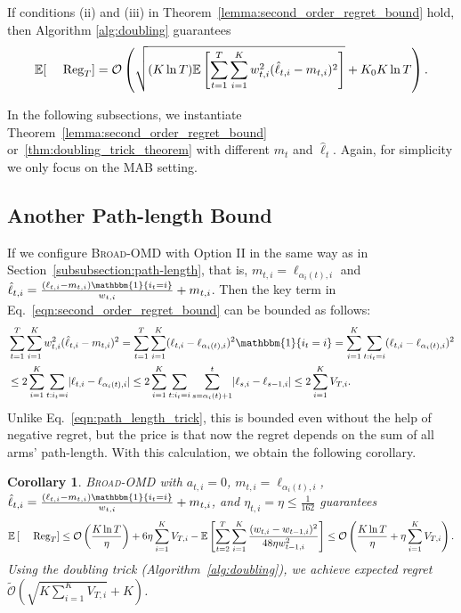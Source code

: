 \documentclass[final, 12pt]{colt2018} %
\newcommand{\abs}[1]{ \lvert {#1} \rvert }
\newcommand{\reg}{\text{\rm Reg}}
\newtheorem{cor}[theorem]{Corollary}
\begin{document}
\begin{theorem}
\label{thm:doubling_trick_theorem}
If conditions (ii) and (iii) in Theorem~\ref{lemma:second_order_regret_bound} hold, then Algorithm \ref{alg:doubling} guarantees
\begin{align*}
\mathbb{E}[\reg_T]=\mathcal{O}\left(\sqrt{(K\ln T)\mathbb{E}\left[\sum_{t=1}^T\sum_{i=1}^Kw_{t,i}^2(\hat{\ell}_{t,i}-m_{t,i})^2\right]}+K_0K\ln T\right).
\end{align*}
\end{theorem}
In the following subsections, we instantiate Theorem~\ref{lemma:second_order_regret_bound} or~\ref{thm:doubling_trick_theorem} with different $m_{t}$ and $\hat{\ell}_t$. Again, for simplicity we only focus on the MAB setting. 

\subsection{Another Path-length Bound}
\label{subsection:first_order_better_k}
If we configure \textsc{Broad-OMD} with Option II in the same way as in Section~\ref{subsubsection:path-length},
that is, $m_{t,i}=\ell_{\alpha_i(t),i}$ and $\hat{\ell}_{t,i}=\frac{(\ell_{t,i}-m_{t,i})\mathbbm{1}\{i_t=i\}}{w_{t,i}}+m_{t,i}$.
Then the key term in Eq.~\eqref{eqn:second_order_regret_bound} can be bounded as follows:
\begin{align}
&\sum_{t=1}^T \sum_{i=1}^K  w_{t,i}^2(\hat{\ell}_{t,i}-m_{t,i})^2= \sum_{t=1}^T\sum_{i=1}^K (\ell_{t,i}-\ell_{\alpha_i(t),i})^2\mathbbm{1}\{i_t=i\} 
= \sum_{i=1}^K \sum_{t:i_t=i} (\ell_{t,i}-\ell_{\alpha_i(t),i})^2 \nonumber \\
&\leq 2 \sum_{i=1}^K \sum_{t:i_t=i} \abs{\ell_{t,i}-\ell_{\alpha_i(t),i}} 
\leq 2 \sum_{i=1}^K \sum_{t:i_t=i} \sum_{s=\alpha_i(t)+1}^t\abs{\ell_{s,i}-\ell_{s-1,i}} \leq 2 \sum_{i=1}^K V_{T,i}. \label{eqn:path_length_calculation_1}
\end{align}
Unlike Eq.~\eqref{eqn:path_length_trick}, this is bounded even without the help of negative regret, but the price is that now the regret depends on the sum of all arms' path-length. With this calculation, we obtain the following corollary.
\begin{cor}
\label{cor:path_length_bound_1}
\textsc{Broad-OMD} with $a_{t,i}=0$, $m_{t,i}=\ell_{\alpha_i(t),i}$, $\hat{\ell}_{t,i}=\frac{(\ell_{t,i}-m_{t,i})\mathbbm{1}\{i_t=i\}}{w_{t,i}}+m_{t,i}$, and $\eta_{t,i}=\eta\leq \frac{1}{162}$ guarantees 
\begin{align*}
\mathbb{E}\left[\reg_T\right]\leq\mathcal{O}\left(\frac{K\ln T}{\eta}\right) + 6\eta\sum_{i=1}^K V_{T,i} -\mathbb{E}\left[\sum_{t=2}^{T} \sum_{i=1}^K\frac{(w_{t,i}-w_{t-1,i})^2}{48\eta w_{t-1,i}^2} \right]\leq \mathcal{O}\left( \frac{K\ln T}{\eta} + \eta\sum_{i=1}^K V_{T,i}  \right). 
\end{align*}
Using the doubling trick (Algorithm~\ref{alg:doubling}), we achieve expected regret $\tilde{\mathcal{O}}\left(\sqrt{K\sum_{i=1}^K V_{T,i}} + K\right)$.
\end{cor}
\end{document}
